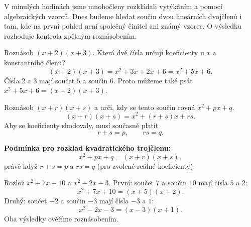 \documentclass[11pt,a4paper]{article}
\begin{document}
V minulých hodinách jsme mnohočleny rozkládali vytýkáním a pomocí algebraických
vzorců. Dnes budeme hledat součin dvou lineárních dvojčlenů i tam, kde na první
pohled není společný činitel ani známý vzorec. O výsledku rozhoduje kontrola
zpětným roznásobením.
\begin{prikladReseniBox}[breakable=false,title={Příklad 1}]
Roznásob $(x+2)(x+3)$. Která dvě čísla určují koeficienty u $x$ a konstantního členu?
\tcblower
\[(x+2)(x+3)=x^2+3x+2x+6=x^2+5x+6.\]
Čísla $2$ a $3$ mají součet $5$ a součin $6$. Proto můžeme také psát
$x^2+5x+6=(x+2)(x+3)$.
\end{prikladReseniBox}
\begin{prikladReseniBox}[breakable=false,title={Příklad 2}]
Roznásob $(x+r)(x+s)$ a urči, kdy se tento součin rovná $x^2+px+q$.
\tcblower
\[(x+r)(x+s)=x^2+(r+s)x+rs.\]
Aby se koeficienty shodovaly, musí současně platit
\[r+s=p,\qquad rs=q.\]
\end{prikladReseniBox}
\begin{zadaniBox}[title={Věta - Rozklad kvadratického trojčlenu}]
\textbf{Podmínka pro rozklad kvadratického trojčlenu:}
\[x^2+px+q=(x+r)(x+s),\]
právě když $r+s=p$ a $rs=q$ (pro zvolené reálné koeficienty).
\end{zadaniBox}
\begin{prikladReseniBox}[breakable=false,title={Příklad 3}]
Rozlož $x^2+7x+10$ a $x^2-2x-3$.
\tcblower
První: součet $7$ a součin $10$ mají čísla $5$ a $2$:
\[x^2+7x+10=(x+5)(x+2).\]
Druhý: součet $-2$ a součin $-3$ mají čísla $-3$ a $1$:
\[x^2-2x-3=(x-3)(x+1).\]
Oba výsledky ověříme roznásobením.
\end{prikladReseniBox}
\end{document}
